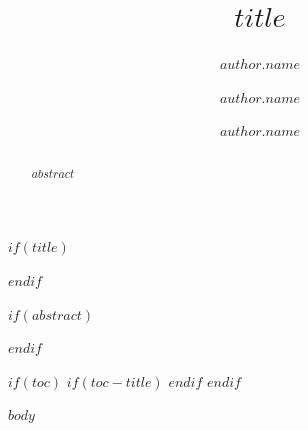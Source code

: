 \documentclass[11pt, a4paper]{article}
\date{}
\title{$title$}
\author[$author.affilnumber$*]{$author.name$}
\author[$author.affilnumber$]{$author.name$}
\author{$author.name$}
\affil[$affil.number$]{$affil.name$}
\affil[*]{\corresponding}
\begin{document}
	$if(title)$
	\maketitle
	$endif$

	$if(abstract)$
	\begin{abstract}
		\noindent
		$abstract$
	\end{abstract}
	$endif$

	$if(toc)$
  $if(toc-title)$
  \renewcommand*\contentsname{$toc-title$}
  $endif$
  \setcounter{tocdepth}{$toc-depth$}
  \tableofcontents
  \newpage
  $endif$

	\setlength\parindent{.5cm}
	$body$
\end{document}
